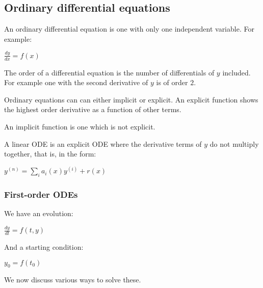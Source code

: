 
\subsection{Ordinary differential equations}

An ordinary differential equation is one with only one independent variable. For example:

$\frac{dy}{dx}=f(x)$

The order of a differential equation is the number of differentials of \(y\) included. For example one with the second derivative of \(y\) is of order \(2\).

Ordinary equations can can either implicit or explicit. An explicit function shows the highest order derivative as a function of other terms.

An implicit function is one which is not explicit.

A linear ODE is an explicit ODE where the derivative terms of \(y\) do not multiply together, that is, in the form:

$y^{(n)}=\sum_ia_i(x)y^{(i)}+r(x)$

\subsubsection{First-order ODEs}

We have an evolution:

\(\frac{dy}{dt}=f(t,y)\)

And a starting condition:

\(y_0=f(t_0)\)

We now discuss various ways to solve these.

